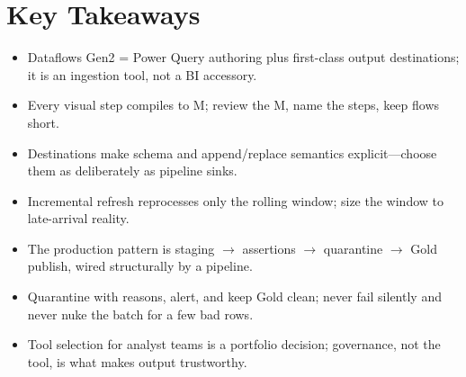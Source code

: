 \section*{Key Takeaways}
\begin{itemize}
    \item Dataflows Gen2 = Power Query authoring plus first-class output destinations; it is an ingestion tool, not a BI accessory.
    \item Every visual step compiles to M; review the M, name the steps, keep flows short.
    \item Destinations make schema and append/replace semantics explicit---choose them as deliberately as pipeline sinks.
    \item Incremental refresh reprocesses only the rolling window; size the window to late-arrival reality.
    \item The production pattern is staging $\rightarrow$ assertions $\rightarrow$ quarantine $\rightarrow$ Gold publish, wired structurally by a pipeline.
    \item Quarantine with reasons, alert, and keep Gold clean; never fail silently and never nuke the batch for a few bad rows.
    \item Tool selection for analyst teams is a portfolio decision; governance, not the tool, is what makes output trustworthy.
\end{itemize}

